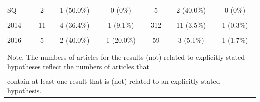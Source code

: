 \documentclass[
  12pt,
]{article}
\begin{document}
\begin{table}[H]
{\begin{tabular}[t]{lcccccc}
\hspace{1em}\hspace{1em}SQ & 2 & 1 (50.0\%) & 0 (0\%) & 5 & 2 (40.0\%) & 0 (0\%)\\
\cellcolor{gray!6}{\hspace{1em}Year} & \cellcolor{gray!6}{} & \cellcolor{gray!6}{} & \cellcolor{gray!6}{} & \cellcolor{gray!6}{} & \cellcolor{gray!6}{} & \cellcolor{gray!6}{}\\
\hspace{1em}\hspace{1em}2014 & 11 & 4 (36.4\%) & 1 (9.1\%) & 312 & 11 (3.5\%) & 1 (0.3\%)\\
\cellcolor{gray!6}{\hspace{1em}\hspace{1em}2015} & \cellcolor{gray!6}{3} & \cellcolor{gray!6}{0 (0\%)} & \cellcolor{gray!6}{0 (0\%)} & \cellcolor{gray!6}{33} & \cellcolor{gray!6}{0 (0\%)} & \cellcolor{gray!6}{0 (0\%)}\\
\hspace{1em}\hspace{1em}2016 & 5 & 2 (40.0\%) & 1 (20.0\%) & 59 & 3 (5.1\%) & 1 (1.7\%)\\
\cellcolor{gray!6}{\hspace{1em}Total} & \cellcolor{gray!6}{19} & \cellcolor{gray!6}{6 (31.6\%)} & \cellcolor{gray!6}{2 (10.5\%)} & \cellcolor{gray!6}{404} & \cellcolor{gray!6}{14 (3.5\%)} & \cellcolor{gray!6}{2 (0.5\%)}\\
\bottomrule
\multicolumn{7}{l}{\textsuperscript{} Note. The numbers of articles for the results (not) related to explicitly stated hypotheses reflect the numbers of articles that}\\
\multicolumn{7}{l}{\textsuperscript{} contain at least one result that is (not) related to an explicitly stated hypothesis.}\\
\end{tabular}}
\end{table}

\hspace{20em}
\newline
\end{document}
